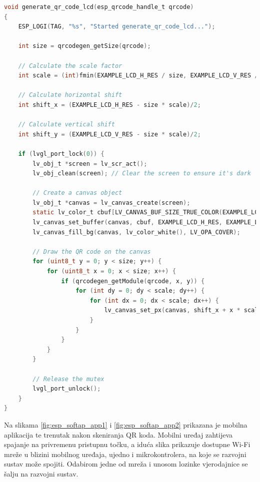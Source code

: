\begin{lstlisting}[caption={Funkcija za prikaz QR koda na zaslonu}, language=c]
void generate_qr_code_lcd(esp_qrcode_handle_t qrcode)
{
	ESP_LOGI(TAG, "%s", "Started generate_qr_code_lcd...");
	
	int size = qrcodegen_getSize(qrcode);
	
	// Calculate the scale factor
	int scale = (int)fmin(EXAMPLE_LCD_H_RES / size, EXAMPLE_LCD_V_RES / size);
	
	// Calculate horizontal shift
	int shift_x = (EXAMPLE_LCD_H_RES - size * scale)/2;
	
	// Calculate vertical shift
	int shift_y = (EXAMPLE_LCD_V_RES - size * scale)/2;
	
	if (lvgl_port_lock(0)) {
		lv_obj_t *screen = lv_scr_act();
		lv_obj_clean(screen); // Clear the screen to ensure it's dark
		
		// Create a canvas object
		lv_obj_t *canvas = lv_canvas_create(screen);
		static lv_color_t cbuf[LV_CANVAS_BUF_SIZE_TRUE_COLOR(EXAMPLE_LCD_H_RES, EXAMPLE_LCD_V_RES)];
		lv_canvas_set_buffer(canvas, cbuf, EXAMPLE_LCD_H_RES, EXAMPLE_LCD_V_RES, LV_IMG_CF_TRUE_COLOR);
		lv_canvas_fill_bg(canvas, lv_color_white(), LV_OPA_COVER);
		
		// Draw the QR code on the canvas
		for (uint8_t y = 0; y < size; y++) {
			for (uint8_t x = 0; x < size; x++) {
				if (qrcodegen_getModule(qrcode, x, y)) {
					for (int dy = 0; dy < scale; dy++) {
						for (int dx = 0; dx < scale; dx++) {
							lv_canvas_set_px(canvas, shift_x + x * scale + dx, shift_y + y * scale + dy, lv_color_black());
						}
					}
				}
			}
		}
		
		// Release the mutex
		lvgl_port_unlock();
	}
}
\end{lstlisting}

Na slikama \ref{fig:esp_softap_app1} i \ref{fig:esp_softap_app2} prikazana je mobilna aplikacija te trenutak nakon skeniranja QR koda. Mobilni uređaj zahtijeva spajanje na privremenu pristupnu točku, a iduća slika prikazuje dostupne Wi-Fi mreže u blizini mobilnog uređaja, ujedno i mikrokontrolera, na koje se razvojni sustav može spojiti. Odabirom jedne od mreža i unosom lozinke vjerodajnice se šalju na razvojni sustav.

